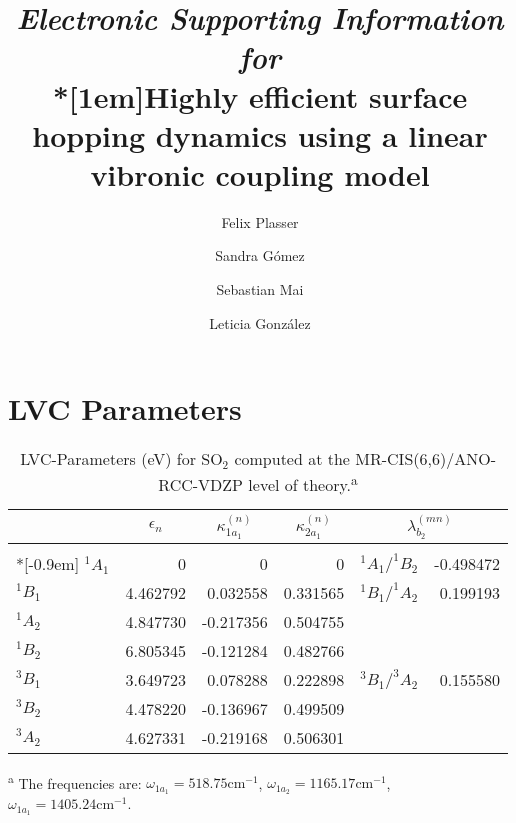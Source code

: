\documentclass[journal=jpclcd,manuscript=article
]{achemso}
\author{Felix Plasser}
\author{Sandra G\'omez}
\author{Sebastian Mai}
\author{Leticia Gonz\'alez}
\title{\textit{Electronic Supporting Information for}\\*[1em]Highly efficient surface hopping dynamics using a linear vibronic coupling model}
\begin{document}

\section{LVC Parameters}

 \begin{table*}[h!]
 \label{tab:LVC}
 \caption{LVC-Parameters (eV) for SO$_2$ computed at the MR-CIS(6,6)/ANO-RCC-VDZP level of theory.\textsuperscript{a}}
 \begin{tabular}{lrrr|rr}
 \hline
  & \multicolumn{1}{c}{$\epsilon_n$} & \multicolumn{1}{c}{$\kappa_{1a_1}^{(n)}$} & \multicolumn{1}{c}{$\kappa_{2a_1}^{(n)}$} & \multicolumn{2}{|c}{$\lambda_{b_2}^{(mn)}$} \\
 \hline
 &&&&& \\*[-0.9em]
 $^1A_1$ &     0 &      0 &      0 & $^1A_1/^1B_2$ & -0.498472\\
 $^1B_1$ & 4.462792 & 0.032558 & 0.331565 & $^1B_1/^1A_2$ & 0.199193 \\ 
$^1A_2$ & 4.847730 & -0.217356 & 0.504755 \\ 
$^1B_2$ & 6.805345 & -0.121284 & 0.482766 \\ 
$^3B_1$ & 3.649723 & 0.078288 & 0.222898 & $^3B_1/^3A_2$  & 0.155580  \\ 
$^3B_2$ & 4.478220 & -0.136967 & 0.499509 \\ 
$^3A_2$ & 4.627331 & -0.219168 & 0.506301 \\
 \hline
 \end{tabular}
 
 \vspace{0.5em}
 \textsuperscript{a} The frequencies are: $\omega_{1a_1}=518.75\mathrm{cm}^{-1}$, $\omega_{1a_2}=1165.17\mathrm{cm}^{-1}$, $\omega_{1a_1}=1405.24\mathrm{cm}^{-1}$.
 \end{table*}
\end{document}
